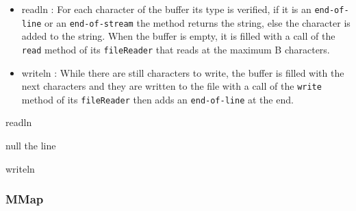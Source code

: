 \documentclass[12pt]{article}
\begin{document}
\begin{itemize}
    \item readln : For each character of the buffer its type is verified, if it is an \texttt{end-of-line} or an \texttt{end-of-stream} the method returns the string, else the character is added to the string. When the buffer is empty, it is filled with a call of the \texttt{read} method of its \texttt{fileReader} that reads at the maximum B characters.
    
    \item writeln : While there are still characters to write, the buffer is filled with the next characters and they are written to the file with a call of the \texttt{write} method of its \texttt{fileReader} then adds an \texttt{end-of-line} at the end.
\end{itemize}

\begin{algorithm}[H]
\caption{readln}
\label{algo:5}
\begin{algorithmic}[1]
\RETURN null
\ELSE
{}
\ENDIF
{}
\ENDWHILE
\RETURN the line
\ENDIF
\end{algorithmic}
\end{algorithm}

\begin{algorithm}[H]
\caption{writeln}
\label{algo:6}
\begin{algorithmic}[1]
\ENDIF
{}
\ENDFOR
{}
\end{algorithmic}
\end{algorithm}

\subsubsection{MMap}
\end{document}
